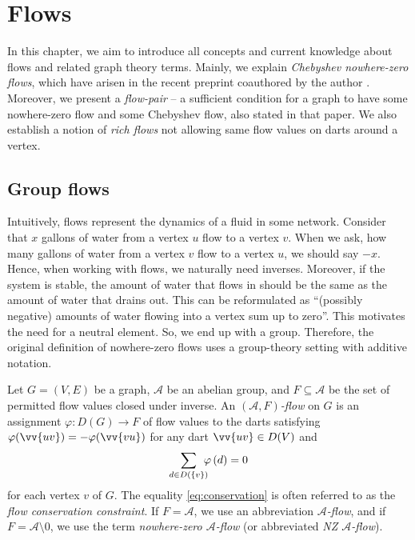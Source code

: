 \chapter{Flows} %

In this chapter, we aim to introduce all concepts and current knowledge about flows and related graph theory terms. Mainly, we explain \emph{Chebyshev nowhere-zero flows}, which
have arisen in the recent preprint coauthored by the author \cite{preprint}. Moreover, we present a \emph{flow-pair} -- a sufficient condition for a graph to have
some nowhere-zero flow and some Chebyshev flow, also stated in that paper. We also establish a notion of \emph{rich flows} not allowing same flow values on darts around a vertex.

\section{Group flows}

Intuitively, flows represent the dynamics of a fluid in some network. Consider that $x$ gallons of water from a vertex $u$ flow to a vertex $v$. When we ask, how many gallons of water from a vertex $v$ flow to a vertex $u$, we should say $-x$. Hence, when working with flows, we naturally need inverses. Moreover, if the system is stable, the amount of water that flows in should be the same as the amount of water that drains out. This can be reformulated as ``(possibly negative) amounts of water flowing into a vertex sum up to zero''. This motivates the need for a neutral element. So, we end up with a group. Therefore, the original definition of nowhere-zero flows uses a group-theory setting with additive notation.

\begin{definition}
Let $G=(V, E)$ be a graph, $\mathcal A$ be an abelian group, and $F\subseteq\mathcal A$ be the set of permitted flow values closed under inverse. An \emph{$(\mathcal A, F)$-flow} on $G$ is an assignment $\varphi\colon D(G)\to F$ of flow values to the darts satisfying
$\varphi(\vv{uv})=-\varphi(\vv{vu})$ for any dart $\vv{uv}\in D(V)$ and
\begin{equation}
\sum_{d\in D(\{v\})} \mkern-10mu\varphi\left(d\right) = 0 \label{eq:conservation}
\end{equation}
for each vertex $v$ of $G$. The equality \eqref{eq:conservation} is often referred to as the \emph{flow conservation constraint}. If $F=\mathcal A$, we use an abbreviation \emph{$\mathcal A$-flow}, and if $F=\mathcal A\setminus{0}$, we use the term \emph{nowhere-zero $\mathcal A$-flow} (or abbreviated \emph{NZ $\mathcal A$-flow}).
\end{definition}

